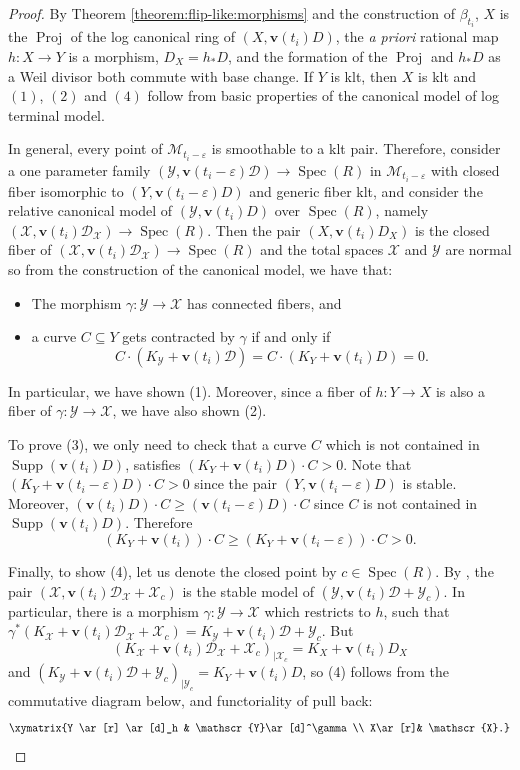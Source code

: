 \documentclass[11pt]{amsart}
\theoremstyle{definition}
\theoremstyle{remark}
\newcommand{\calD}{\mathcal D}
\newcommand{\sD}{\mathscr{D}}
\newcommand{\sM}{\mathscr{M}}
\newcommand{\sX}{\mathscr{X}}
\newcommand{\sY}{\mathscr{Y}}
\newcommand{\Supp}{\operatorname{Supp}}
\newcommand{\Spec}{\operatorname{Spec}}
\newcommand{\bfv}{\mathbf{v}}
\begin{document}
	\begin{proof}
		
		
		By Theorem \ref{theorem:flip-like:morphisms} and the construction of $\beta_{t_i}$, $X$ is the $\operatorname{Proj}$ of the log canonical ring of $(X, \bfv(t_i)D)$, the \emph{a priori} rational map $h : X \to Y$ is a morphism, $D_X = h_*D$, and the formation of the $\operatorname{Proj}$ and $h_*D$ as a Weil divisor both commute with base change. If $Y$ is klt, then $X$ is klt and $(1)$, $(2)$ and $(4)$ follow from basic properties of the canonical model of log terminal model. 
		
		In general, every point of $\sM_{t_i - \varepsilon}$ is smoothable to a klt pair. Therefore, consider a one parameter family $(\sY,\mathbf{v}(t_i-\varepsilon)\sD) \to \Spec(R)$ in $\sM_{t_i-\varepsilon}$ with closed fiber isomorphic to $(Y,\mathbf{v}(t_i-\varepsilon)D)$ and generic fiber klt, and consider the relative canonical model of $(\sY,\mathbf{v}(t_i)D)$ over $\Spec(R)$, namely $(\sX,\mathbf{v}(t_i)\sD_{\sX}) \to \Spec(R)$. Then the pair $(X,\mathbf{v}(t_i)D_X)$ is the closed fiber of $(\sX,\mathbf{v}(t_i)\sD_{\sX}) \to \Spec(R)$ and the total spaces $\sX$ and $\sY$ are normal so from the construction of the canonical model, we have that:
		\begin{itemize}
			\item The morphism $\gamma:\sY \to \sX$ has connected fibers, and
			\item a curve $C \subseteq Y$ gets contracted by $\gamma$ if and only if $$C \cdot(K_\sY+\mathbf{v}(t_i)\sD)=C \cdot(K_Y+\mathbf{v}(t_i)D)=0.$$
		\end{itemize}In particular, we have shown (1). Moreover, since a fiber of $h: Y \to X$ is also a fiber of $\gamma: \sY \to \sX$, we have also shown (2).
		
		To prove (3), we only need to check that a curve $C$ which is not contained in $\Supp(\mathbf{v}(t_i)D)$, satisfies $(K_Y+\mathbf{v}(t_i)D) \cdot C>0$. Note that $(K_Y+\mathbf{v}(t_i-\varepsilon)D) \cdot C>0$ since the pair $(Y,\mathbf{v}(t_i-\varepsilon)D)$ is stable.
		Moreover, $(\mathbf{v}(t_i)D) \cdot C \ge (\mathbf{v}(t_i-\varepsilon)D)\cdot C$ since $C$ is not contained in $\Supp(\mathbf{v}(t_i)D)$. Therefore
		$$(K_Y+\mathbf{v}(t_i)) \cdot C \ge (K_Y+\mathbf{v}(t_i-\varepsilon)) \cdot C>0.$$
		
		Finally, to show (4), let us denote the closed point by $c \in \Spec(R)$. By \cite[Lemma 1.28]{Kollarsingmmp}, the pair $(\sX,\mathbf{v}(t_i)\calD_{\sX}+\sX_c)$ is the stable model of $(\sY,\mathbf{v}(t_i)\sD+\sY_c)$. In particular, there is a morphism $\gamma:\sY \to \sX$ which restricts to $h$,  such that $\gamma^*(K_{\sX} +\mathbf{v}(t_i)\sD_{\sX}+\sX_c)=K_{\sY}+\mathbf{v}(t_i)\sD+\sY_c$. But
		$$(K_{\sX}+ \mathbf{v}(t_i)\sD_{\sX}+\sX_c)_{|\sX_c}=K_X+\mathbf{v}(t_i)D_X$$ and $(K_\sY+\mathbf{v}(t_i)\sD+\sY_c)_{|\sY_c}=K_Y+\mathbf{v}(t_i)D$, so (4) follows from the commutative diagram below, and functoriality of pull back:
		$$\xymatrix{Y \ar[r] \ar[d]_h & \sY \ar[d]^\gamma \\ X\ar[r]& \sX.}$$\end{proof}
	
\end{document}
